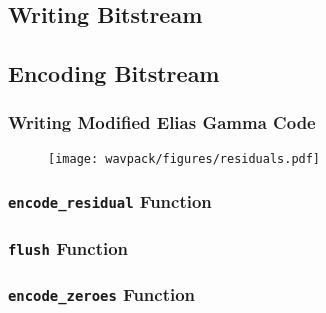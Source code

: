 
\subsection{Writing Bitstream}
\label{wavpack:write_bitstream}


\clearpage

\subsection{Encoding Bitstream}
\label{wavpack:encode_bitstream}
{
  
}

\clearpage

\subsubsection{Writing Modified Elias Gamma Code}
\label{wavpack:write_egc}


\begin{figure}[h]
  \texttt{[image: wavpack/figures/residuals.pdf]}
\end{figure}

\clearpage

\subsubsection{\texttt{encode\_residual} Function}
\label{wavpack:encode_residual}
{
  
}

\clearpage

\subsubsection{\texttt{flush} Function}
\label{wavpack:flush_residual}
{
  
}

\clearpage

\subsubsection{\texttt{encode\_zeroes} Function}
\label{wavpack:encode_zeroes}
{
  
}

